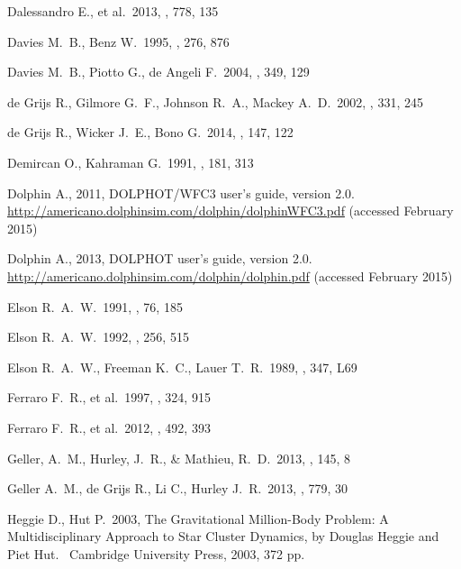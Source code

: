\documentclass[useAMS,usenatbib,twocolumn]{mnras}
\begin{document}
\begin{thebibliography}{57}
 Dalessandro E., et al.\ 2013, \apj, 778, 135 

 Davies M.~B., Benz W.\ 1995, \mnras, 276, 876 

 Davies M.~B., Piotto G., de Angeli F.\ 2004, \mnras, 349, 129 

 de Grijs R., Gilmore G.~F., Johnson R.~A., Mackey A.~D.\ 2002, \mnras, 331, 245 

 de Grijs R., Wicker J.~E., Bono G.\ 2014, \aj, 147, 122 

 Demircan O., Kahraman G.\ 1991, \apss, 181, 313 

 {Dolphin} A., 2011, DOLPHOT/WFC3
  user's guide, version 2.0. \\ \url{
    http://americano.dolphinsim.com/dolphin/dolphinWFC3.pdf} (accessed
  February 2015)

 {Dolphin} A., 2013, DOLPHOT user's
  guide, version 2.0. \\ \url{
    http://americano.dolphinsim.com/dolphin/dolphin.pdf} (accessed
  February 2015)

 Elson R.~A.~W.\ 1991, \apjs, 76, 185 

 Elson R.~A.~W.\ 1992, \mnras, 256, 515 

 Elson R.~A.~W., Freeman K.~C., Lauer T.~R.\ 1989, \apjl, 347, L69 

 Ferraro F.~R., et al.\ 1997, \aap, 324, 915 

 Ferraro F.~R., et al.\ 2012, \nat, 492, 393 

 Geller, A.~M., Hurley, J.~R., \& Mathieu, R.~D.\ 2013, \aj, 145, 8 

 Geller A.~M., de Grijs R., Li C., Hurley J.~R.\ 2013, \apj, 779, 30 

 Heggie D., Hut P.\ 2003, The Gravitational Million-Body Problem: A Multidisciplinary Approach to Star Cluster Dynamics, by Douglas Heggie and Piet Hut.~ Cambridge University Press, 2003, 372 pp.


\end{thebibliography}
\end{document}
